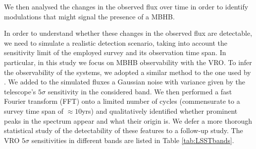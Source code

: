 \documentclass{aa}
\begin{document}
We then analysed the changes in the observed flux over time in order to identify modulations that might signal the presence of a MBHB. 

In order to understand whether these changes in the observed flux are detectable, we need to simulate a realistic detection scenario, taking into account the sensitivity limit of the employed survey and its observation time span. In particular, in this study we focus on MBHB observability with the VRO. To infer the observability of the systems, we adopted a similar method to the one used by \cite{Kelly2019}.
We added to the simulated fluxes a Gaussian noise with variance given by the telescope's $5 \sigma$ sensitivity in the considered band. We then performed a fast Fourier transform (FFT) onto a limited number of cycles (commensurate to a survey time span of $\approx 10$yrs) and qualitatively identified whether prominent peaks in the spectrum appear and what their origin is. We defer a more thorough statistical study of the detectability of these features to a follow-up study.
The VRO $5 \sigma$ sensitivities in different bands are listed in Table \ref{tab:LSSTbands}. 

\begin{table}
\caption{Frequency bands and 5-$\sigma$ flux sensitivities of the VRO telescope's optical filters.}
    \label{tab:LSSTbands}

      
\end{table}
\end{document}
